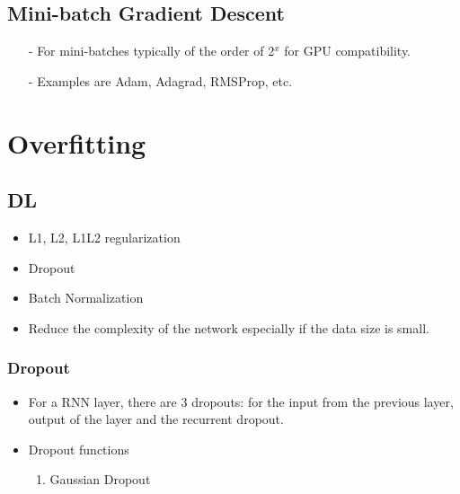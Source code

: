 \documentclass[a4paper, 12pt]{report}
\begin{document}
\section{Mini-batch Gradient Descent}
\begin{itemize}
\item[-] For mini-batches typically of the order of 2$^x$ for GPU compatibility.
\item[-] Examples are Adam, Adagrad, RMSProp, etc.
\end{itemize}


\chapter{Overfitting}

\section{DL}
\begin{itemize}
\item L1, L2, L1L2 regularization
\item Dropout
\item Batch Normalization
\item Reduce the complexity of the network especially if the data size is small.
\end{itemize}

\subsection{Dropout}
\begin{itemize}

\item For a RNN layer, there are 3 dropouts: for the input from the previous layer, output of the layer and the recurrent dropout.
\item Dropout functions
\begin{enumerate}
\item Gaussian Dropout
\end{enumerate}
\end{itemize}
\end{document}
